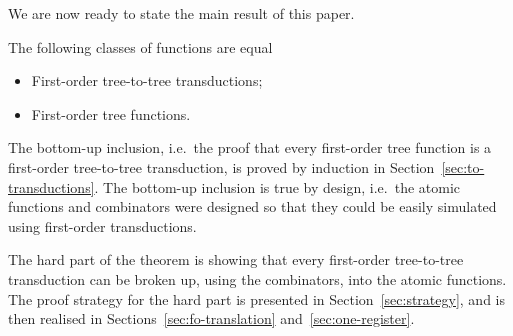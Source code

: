 \bigskip
\noindent\begin{example}
\end{example}

We are now ready to state the main result of this paper. 
\begin{theorem}\label{thm:main}
    The following classes of functions are equal\begin{itemize}
        \item First-order tree-to-tree transductions;
        \item First-order tree functions.
    \end{itemize}
\end{theorem}

The bottom-up inclusion, i.e.~the proof that every first-order tree function is a first-order tree-to-tree transduction, is proved by induction in Section~\ref{sec:to-transductions}.  The bottom-up inclusion is true by design, i.e.~the atomic functions and combinators were designed so that they could be easily  simulated using first-order transductions. 

The hard part of the theorem is showing that every first-order tree-to-tree transduction can be broken up, using the combinators, into the atomic functions. The proof strategy for the hard part is presented in Section~\ref{sec:strategy}, and is then realised in Sections~\ref{sec:fo-translation} and~\ref{sec:one-register}.